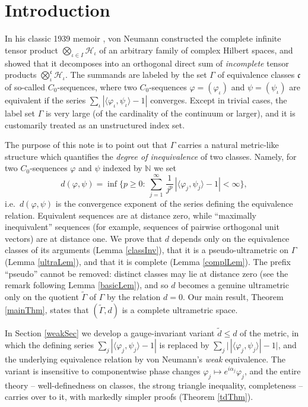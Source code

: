 \documentclass[twoside,11pt,letter]{article}
\def\bN{\mathbb{N}}
\def\cH{{\mathcal{H}}}
\def\fc{{\mathfrak{c}}}
\theoremstyle{definition}
\theoremstyle{definition}
\theoremstyle{plain}
\begin{document}
\newpage

\section{\label{introSec}Introduction}

In his classic 1939 memoir \cite{vN39}, von Neumann constructed the complete infinite tensor product $\bigotimes_{\iota\in I}\cH_\iota$ of an arbitrary family of complex Hilbert spaces, and showed that it decomposes into an orthogonal direct sum of \emph{incomplete} tensor products $\bigotimes^\fc_{\iota}\cH_\iota$. The summands are labeled by the set $\Gamma$ of equivalence classes $\fc$ of so-called $C_0$-sequences, where two $C_0$-sequences $\varphi=(\varphi_\iota)$ and $\psi=(\psi_\iota)$ are equivalent if the series $\sum_\iota|\langle\varphi_\iota,\psi_\iota\rangle-1|$ converges. Except in trivial cases, the label set $\Gamma$ is very large (of the cardinality of the continuum or larger), and it is customarily treated as an unstructured index set.

The purpose of this note is to point out that $\Gamma$ carries a natural metric-like structure which quantifies the \emph{degree of inequivalence} of two classes. Namely, for two $C_0$-sequences $\varphi$ and $\psi$ indexed by $\bN$ we set
\begin{equation*}
d(\varphi,\psi)=\inf\Big\{p\geq 0:\:\sum_{j=1}^\infty\,\frac{1}{j^p}\,|\langle \varphi_j,\psi_j\rangle-1|<\infty\Big\},
\end{equation*}
i.e.\ $d(\varphi,\psi)$ is the convergence exponent of the series defining the equivalence relation. Equivalent sequences are at distance zero, while ``maximally inequivalent'' sequences (for example, sequences of pairwise orthogonal unit vectors) are at distance one. We prove that $d$ depends only on the equivalence classes of its arguments (Lemma \ref{classInv}), that it is a pseudo-ultrametric on $\Gamma$ (Lemma \ref{ultraLem}), and that it is complete (Lemma \ref{complLem}). The prefix ``pseudo'' cannot be removed: distinct classes may lie at distance zero (see the remark following Lemma \ref{basicLem}), and so $d$ becomes a genuine ultrametric only on the quotient $\widetilde\Gamma$ of $\Gamma$ by the relation $d=0$. Our main result, Theorem \ref{mainThm}, states that $(\widetilde\Gamma,d)$ is a complete ultrametric space.

In Section \ref{weakSec} we develop a gauge-invariant variant $\tilde d\leq d$ of the metric, in which the defining series $\sum_j|\langle\varphi_j,\psi_j\rangle-1|$ is replaced by $\sum_j\big|\,|\langle\varphi_j,\psi_j\rangle|-1\big|$, and the underlying equivalence relation by von Neumann's \emph{weak} equivalence. The variant is insensitive to componentwise phase changes $\varphi_j\mapsto e^{i\alpha_j}\varphi_j$, and the entire theory -- well-definedness on classes, the strong triangle inequality, completeness -- carries over to it, with markedly simpler proofs (Theorem \ref{tdThm}).
\end{document}
